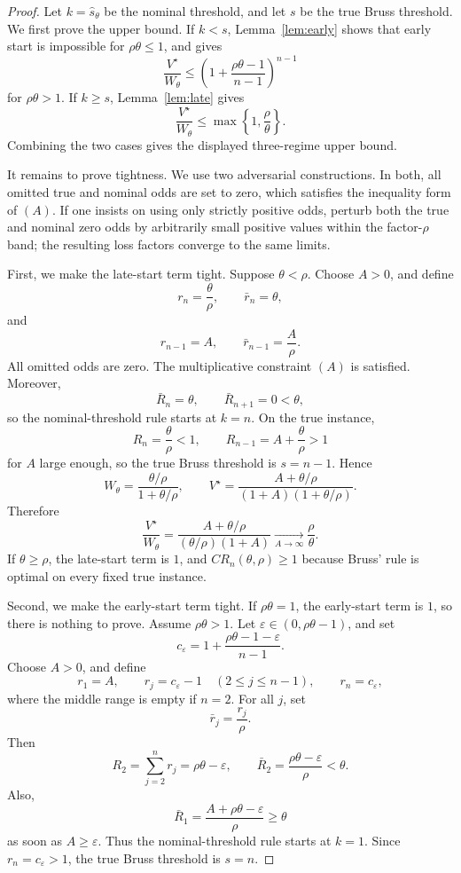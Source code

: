 \documentclass[11pt,a4paper]{article}
\begin{document}
\begin{proof}
Let \(k=\hat s_\theta\) be the nominal threshold, and let \(s\) be the true
Bruss threshold.  We first prove the upper bound.  If \(k<s\),
Lemma~\ref{lem:early} shows that early start is impossible for
\(\rho\theta\le1\), and gives
\[
  \frac{V^\star}{W_\theta}
  \le
  \left(1+\frac{\rho\theta-1}{n-1}\right)^{n-1}
\]
for \(\rho\theta>1\).  If \(k\ge s\), Lemma~\ref{lem:late} gives
\[
  \frac{V^\star}{W_\theta}
  \le
  \max\left\{1,\frac{\rho}{\theta}\right\}.
\]
Combining the two cases gives the displayed three-regime upper bound.

It remains to prove tightness.  We use two adversarial constructions.  In both,
all omitted true and nominal odds are set to zero, which satisfies the
inequality form of \((A)\).  If one insists on using only strictly positive
odds, perturb both the true and nominal zero odds by arbitrarily small
positive values within the factor-\(\rho\) band; the resulting loss factors
converge to the same limits.

First, we make the late-start term tight.  Suppose \(\theta<\rho\).
Choose \(A>0\), and define
\[
  r_n=\frac{\theta}{\rho},
  \qquad
  \bar r_n=\theta,
\]
and
\[
  r_{n-1}=A,
  \qquad
  \bar r_{n-1}=\frac A\rho.
\]
All omitted odds are zero.  The multiplicative constraint \((A)\) is satisfied.
Moreover,
\[
  \bar R_n=\theta,
  \qquad
  \bar R_{n+1}=0<\theta,
\]
so the nominal-threshold rule starts at \(k=n\).  On the true instance,
\[
  R_n=\frac{\theta}{\rho}<1,
  \qquad
  R_{n-1}=A+\frac{\theta}{\rho}>1
\]
for \(A\) large enough, so the true Bruss threshold is \(s=n-1\).  Hence
\[
  W_\theta=\frac{\theta/\rho}{1+\theta/\rho},
  \qquad
  V^\star=\frac{A+\theta/\rho}{(1+A)(1+\theta/\rho)}.
\]
Therefore
\[
  \frac{V^\star}{W_\theta}
  =
  \frac{A+\theta/\rho}{(\theta/\rho)(1+A)}
  \xrightarrow[A\to\infty]{}
  \frac{\rho}{\theta}.
\]
If \(\theta\ge\rho\), the late-start term is \(1\), and
\(CR_n(\theta,\rho)\ge1\) because Bruss' rule is optimal on every fixed true
instance.

Second, we make the early-start term tight.  If \(\rho\theta=1\), the
early-start term is \(1\), so there is nothing to prove.  Assume
\(\rho\theta>1\).  Let \(\varepsilon\in(0,\rho\theta-1)\), and set
\[
  c_\varepsilon
  =
  1+\frac{\rho\theta-1-\varepsilon}{n-1}.
\]
Choose \(A>0\), and define
\[
  r_1=A,
  \qquad
  r_j=c_\varepsilon-1 \quad (2\le j\le n-1),
  \qquad
  r_n=c_\varepsilon,
\]
where the middle range is empty if \(n=2\).  For all \(j\), set
\[
  \bar r_j=\frac{r_j}{\rho}.
\]
Then
\[
  R_2=\sum_{j=2}^n r_j=\rho\theta-\varepsilon,
  \qquad
  \bar R_2=\frac{\rho\theta-\varepsilon}{\rho}<\theta.
\]
Also,
\[
  \bar R_1=\frac{A+\rho\theta-\varepsilon}{\rho}\ge\theta
\]
as soon as \(A\ge\varepsilon\).  Thus the nominal-threshold rule starts at
\(k=1\).  Since \(r_n=c_\varepsilon>1\), the true Bruss threshold is \(s=n\).


\end{proof}
\end{document}
